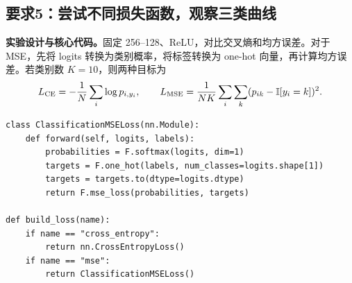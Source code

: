 \documentclass[UTF8,11pt,a4paper,fontset=fandol]{ctexart}
\newcommand{\question}[1]{\Needspace{14\baselineskip}\subsection{#1}}
\begin{document}
\question{要求5：尝试不同损失函数，观察三类曲线}
\textbf{实验设计与核心代码。}固定 256--128、ReLU，对比交叉熵和均方误差。对于 MSE，先将 logits 转换为类别概率，将标签转换为 one-hot 向量，再计算均方误差。若类别数 $K=10$，则两种目标为
\begin{equation}
L_{\rm CE}=-\frac{1}{N}\sum_i\log p_{i,y_i},\qquad
L_{\rm MSE}=\frac{1}{NK}\sum_i\sum_k(p_{ik}-\mathbb{I}[y_i=k])^2.
\end{equation}
\par\noindent\begin{minipage}{\linewidth}
\begin{lstlisting}
class ClassificationMSELoss(nn.Module):
    def forward(self, logits, labels):
        probabilities = F.softmax(logits, dim=1)
        targets = F.one_hot(labels, num_classes=logits.shape[1])
        targets = targets.to(dtype=logits.dtype)
        return F.mse_loss(probabilities, targets)

def build_loss(name):
    if name == "cross_entropy":
        return nn.CrossEntropyLoss()
    if name == "mse":
        return ClassificationMSELoss()
\end{lstlisting}
\end{minipage}\par
\end{document}

